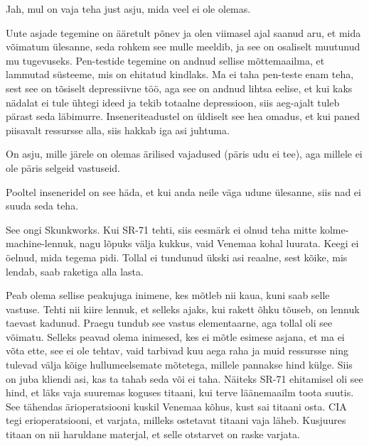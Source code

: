 
Jah, mul on vaja teha just asju, mida veel ei ole olemas. 


Uute asjade tegemine on ääretult põnev ja olen viimasel ajal saanud
aru, et mida võimatum ülesanne, seda rohkem see mulle meeldib, ja see on osaliselt muutunud mu tugevuseks. Pen-testide tegemine on andnud sellise mõttemaailma, et lammutad süsteeme, mis 
on ehitatud kindlaks. Ma ei taha pen-teste enam teha, sest see on 
tõsiselt depressiivne töö, aga see on andnud lihtsa eelise, et kui 
kaks nädalat ei tule ühtegi ideed ja tekib 
totaalne depressioon, siis aeg-ajalt tuleb pärast seda läbimurre. 
Inseneriteadustel on üldiselt see hea omadus, et kui paned piisavalt 
ressursse alla, siis hakkab iga asi juhtuma. 


On asju, mille järele on olemas ärilised vajadused (päris udu ei tee), aga 
millele ei ole päris selgeid vastuseid. 

Pooltel inseneridel on see häda, et kui anda neile väga udune 
ülesanne, siis nad ei suuda seda teha.


See ongi Skunkworks. Kui 
SR-71 
tehti, siis eesmärk ei olnud teha mitte kolme-machine-lennuk, nagu lõpuks välja 
kukkus, vaid Venemaa kohal luurata. Keegi ei 
öelnud, mida tegema pidi. Tollal ei 
tundunud ükski asi reaalne, sest kõike, mis lendab, saab raketiga alla lasta. 

Peab olema sellise peakujuga inimene, kes mõtleb nii kaua, kuni saab selle 
vastuse. Tehti nii kiire lennuk, et selleks ajaks, kui rakett õhku tõuseb, on 
lennuk taevast kadunud. Praegu tundub see vastus elementaarne, aga 
tollal oli see võimatu. Selleks peavad olema 
inimesed, kes ei mõtle esimese asjana, et ma ei võta ette, see ei ole 
tehtav, vaid tarbivad kuu aega raha ja muid ressursse ning 
tulevad välja kõige hullumeelsemate mõtetega, millele pannakse hind külge. 
Siis on juba kliendi asi, kas ta tahab seda või ei taha. Näiteks SR-71 
ehitamisel oli see hind, et läks vaja suuremas koguses titaani, kui terve 
läänemaailm toota suutis. See tähendas ärioperatsiooni kuskil Venemaa kõhus, 
kust sai titaani osta. CIA tegi erioperatsiooni, et varjata, milleks ostetavat titaani vaja läheb. Kusjuures titaan on 
nii haruldane materjal, et selle otstarvet on raske varjata. 

